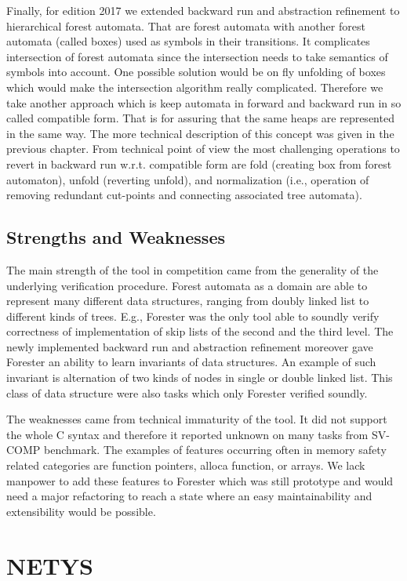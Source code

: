 {Finally, for edition 2017 we extended backward run and abstraction refinement to hierarchical forest automata.
That are forest automata with another forest automata (called boxes) used as symbols in their transitions.
It complicates intersection of forest automata since the intersection needs to take semantics of symbols into account.
One possible solution would be on fly unfolding of boxes which would make the intersection algorithm really complicated.
Therefore we take another approach which is keep automata in forward and backward run in so called compatible form.
That is for assuring that the same heaps are represented in the same way.
The more technical description of this concept was given in the previous chapter.
From technical point of view the most challenging operations to revert in backward run
w.r.t. compatible form are fold (creating box from forest automaton), unfold (reverting unfold),
and normalization (i.e., operation of removing redundant cut-points and connecting associated tree automata).

\section{Strengths and Weaknesses}

The main strength of the tool in competition came from the generality of the underlying
verification procedure.
Forest automata as a domain are able to represent many different data structures,
ranging from doubly linked list to different kinds of trees.
E.g., Forester was the only tool able to soundly verify correctness of implementation of skip lists
of the second and the third level.
The newly implemented backward run and abstraction refinement moreover gave Forester
an ability to learn invariants of data structures.
An example of such invariant is alternation of two kinds of nodes in single or double linked list.
This class of data structure were also tasks which only Forester verified soundly.

The weaknesses came from technical immaturity of the tool.
It did not support the whole C syntax and therefore it reported
unknown on many tasks from SV-COMP benchmark.
The examples of features occurring often in memory safety related categories are function  
pointers, alloca function, or arrays.
We lack manpower to add these features to Forester which was still prototype and
would need a major refactoring to reach a state where an easy maintainability and extensibility would be possible.

\chapter{NETYS}
\label{ch:netys}
}
